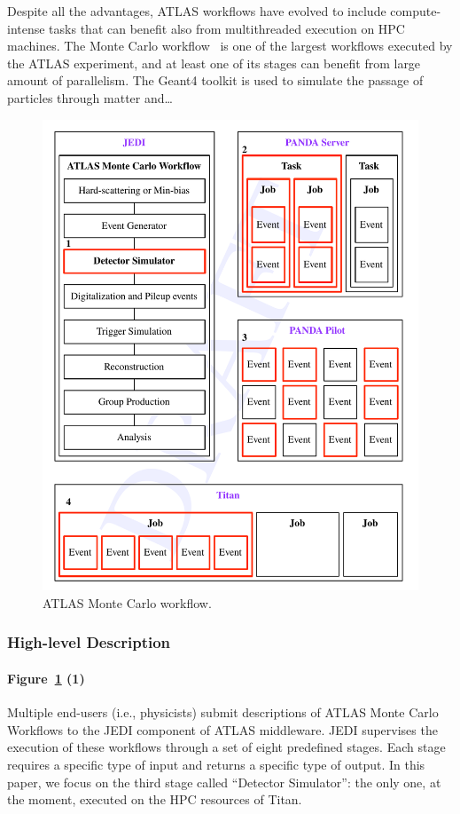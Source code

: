 Despite all the advantages, ATLAS workflows have evolved to include
compute-intense tasks that can benefit also from multithreaded execution on HPC
machines. The Monte Carlo workflow~\cite{} is one of the largest workflows
executed by the ATLAS experiment, and at least one of its stages can benefit
from large amount of parallelism. The Geant4 toolkit is used to simulate the
passage of particles through matter and\ldots

\begin{figure}
  \includegraphics[width=\columnwidth]{figures/atlas_workflow.pdf}
  \caption{ATLAS Monte Carlo workflow.}
\label{fig:atlas_workflow}
\end{figure}

\subsubsection{High-level Description}

\paragraph{Figure~\ref{fig:atlas_workflow} (1)} Multiple end-users (i.e.,
physicists) submit descriptions of ATLAS Monte Carlo Workflows to the JEDI
component of ATLAS middleware. JEDI supervises the execution of these workflows
through a set of eight predefined stages. Each stage requires a specific type of
input and returns a specific type of output. In this paper, we focus on the
third stage called ``Detector Simulator'': the only one, at the moment, executed
on the HPC resources of Titan.

